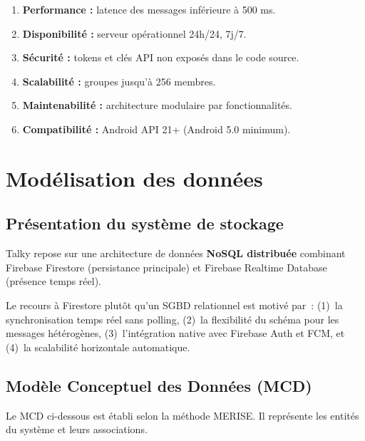\documentclass[12pt,a4paper]{report}
\begin{document}
\begin{enumerate}[leftmargin=1.5cm,label=\textbf{BNF\arabic*}]
  \item \textbf{Performance :} latence des messages inférieure à 500 ms.
  \item \textbf{Disponibilité :} serveur opérationnel 24h/24, 7j/7.
  \item \textbf{Sécurité :} tokens et clés API non exposés dans le code source.
  \item \textbf{Scalabilité :} groupes jusqu'à 256 membres.
  \item \textbf{Maintenabilité :} architecture modulaire par fonctionnalités.
  \item \textbf{Compatibilité :} Android API 21+ (Android 5.0 minimum).
\end{enumerate}

\chapter{Modélisation des données}

\section{Présentation du système de stockage}

Talky repose sur une architecture de données \textbf{NoSQL distribuée} combinant Firebase Firestore (persistance principale) et Firebase Realtime Database (présence temps réel).

\begin{warningbox}
Le recours à Firestore plutôt qu'un SGBD relationnel est motivé par~: (1)~la synchronisation temps réel sans polling, (2)~la flexibilité du schéma pour les messages hétérogènes, (3)~l'intégration native avec Firebase Auth et FCM, et (4)~la scalabilité horizontale automatique.
\end{warningbox}

\section{Modèle Conceptuel des Données (MCD)}

Le MCD ci-dessous est établi selon la méthode MERISE. Il représente les entités du système et leurs associations.
\end{document}

